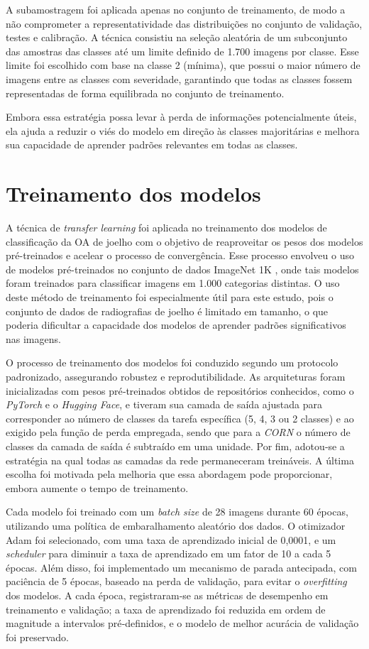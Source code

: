 A subamostragem foi aplicada apenas no conjunto de treinamento, de modo a não comprometer a representatividade das distribuições no conjunto de validação, testes e calibração. A técnica consistiu na seleção aleatória de um subconjunto das amostras das classes até um limite definido de 1.700 imagens por classe. Esse limite foi escolhido com base na classe 2 (mínima), que possui o maior número de imagens entre as classes com severidade, garantindo que todas as classes fossem representadas de forma equilibrada no conjunto de treinamento.

Embora essa estratégia possa levar à perda de informações potencialmente úteis, ela ajuda a reduzir o viés do modelo em direção às classes majoritárias e melhora sua capacidade de aprender padrões relevantes em todas as classes.

\section{Treinamento dos modelos}

A técnica de \textit{transfer learning} foi aplicada no treinamento dos modelos de classificação da OA de joelho com o objetivo de reaproveitar os pesos dos modelos pré-treinados e acelear o processo de convergência. Esse processo envolveu o uso de modelos pré-treinados no conjunto de dados ImageNet 1K \citep{Russakovsky2015}, onde tais modelos foram treinados para classificar imagens em 1.000 categorias distintas. O uso deste método de treinamento foi especialmente útil para este estudo, pois o conjunto de dados de radiografias de joelho é limitado em tamanho, o que poderia dificultar a capacidade dos modelos de aprender padrões significativos nas imagens.

O processo de treinamento dos modelos foi conduzido segundo um protocolo padronizado, assegurando robustez e reprodutibilidade. As arquiteturas foram inicializadas com pesos pré‑treinados obtidos de repositórios conhecidos, como o \textit{PyTorch} e o \textit{Hugging Face}, e tiveram sua camada de saída ajustada para corresponder ao número de classes da tarefa específica (5, 4, 3 ou 2 classes) e ao exigido pela função de perda empregada, sendo que para a \textit{CORN} o número de classes da camada de saída é subtraído em uma unidade. Por fim, adotou‑se a estratégia na qual todas as camadas da rede permaneceram treináveis. A última escolha foi motivada pela melhoria que essa abordagem pode proporcionar, embora aumente o tempo de treinamento.

Cada modelo foi treinado com um \textit{batch size} de 28 imagens durante 60 épocas, utilizando uma política de embaralhamento aleatório dos dados. O otimizador Adam foi selecionado, com uma taxa de aprendizado inicial de 0,0001, e um \textit{scheduler} para diminuir a taxa de aprendizado em um fator de 10 a cada 5 épocas. Além disso, foi implementado um mecanismo de parada antecipada, com paciência de 5 épocas, baseado na perda de validação, para evitar o \textit{overfitting} dos modelos. A cada época, registraram‑se as métricas de desempenho em treinamento e validação; a taxa de aprendizado foi reduzida em ordem de magnitude a intervalos pré‑definidos, e o modelo de melhor acurácia de validação foi preservado.

